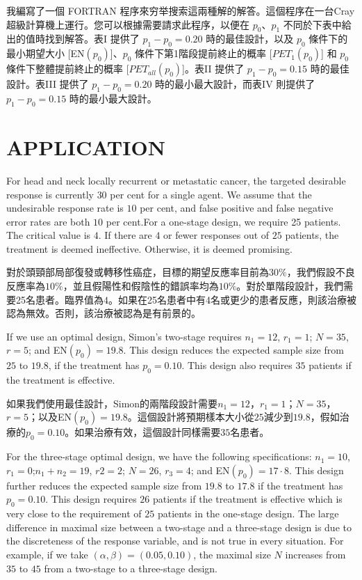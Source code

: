 我編寫了一個 FORTRAN 程序來穷举搜索這兩種解的解答。這個程序在一台Cray超級計算機上運行。您可以根據需要請求此程序，以便在 $p_0$、$p_1$ 不同於下表中給出的值時找到解答。表I 提供了 $p_1 - p_0 = 0.20$ 時的最佳設計，以及 $p_0$ 條件下的最小期望大小 [EN$(p_0)$]、$p_0$ 條件下第1階段提前終止的概率 [$PET_1(p_0)$] 和 $p_0$ 條件下整體提前終止的概率 [$PET_{all}(p_0)$]。表II 提供了 $p_1 - p_0 = 0.15$ 時的最佳設計。表III 提供了 $p_1 - p_0 = 0.20$ 時的最小最大設計，而表IV 則提供了 $p_1 - p_0 = 0.15$ 時的最小最大設計。

\section{APPLICATION}
For head and neck locally recurrent or metastatic cancer, the targeted desirable response is currently $30$ per cent for a single agent. We assume that the undesirable response rate is $10$ per cent, and false positive and false negative error rates are both $10$ per cent.For a one-stage design, we require 25 patients. The critical value is $4$. If there are $4$ or fewer responses out of $25$ patients, the treatment is deemed ineffective. Otherwise, it is deemed promising.

對於頭頸部局部復發或轉移性癌症，目標的期望反應率目前為$30\%$，我們假設不良反應率為$10\%$，並且假陽性和假陰性的錯誤率均為$10\%$。對於單階段設計，我們需要25名患者。臨界值為$4$。如果在25名患者中有4名或更少的患者反應，則該治療被認為無效。否則，該治療被認為是有前景的。

If we use an optimal design, Simon’s two-stage requires $n_1=12$, $r_1=1$; $N=35$, $r=5$; and EN$(p_0)=19.8$. This design reduces the expected sample size from $25$ to $19.8$, if the treatment has $p_0=0.10$. This design also requires $35$ patients if the treatment is effective.

如果我們使用最佳設計，Simon的兩階段設計需要$n_1=12$，$r_1=1$；$N=35$，$r=5$；以及EN$(p_0)=19.8$。這個設計將預期樣本大小從$25$減少到$19.8$，假如治療的$p_0=0.10$。如果治療有效，這個設計同樣需要$35$名患者。

For the three-stage optimal design, we have the following specifications: $n_1=10$, $r_1=0$;$n_1+n_2=19$, $r2=2$; $N=26$, $r_3=4$; and EN$(p_0)=17·8$. This design further reduces the expected sample size from $19.8$ to $17.8$ if the treatment has $p_0=0.10$. This design requires $26$ patients if the treatment is effective which is very close to the requirement of $25$ patients in the one-stage design. The large difference in maximal size between a two-stage and a three-stage design is due to the discreteness of the response variable, and is not true in every situation. For example, if we take $(\alpha, \beta)=(0.05, 0.10)$, the maximal size $N$ increases from $35$ to $45$ from a two-stage to a three-stage design.

